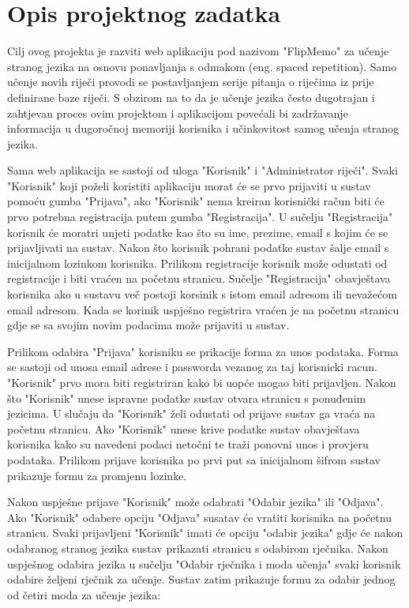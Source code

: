 \chapter{Opis projektnog zadatka}

Cilj ovog projekta je razviti web aplikaciju pod nazivom "FlipMemo" za učenje stranog jezika na osnovu ponavljanja s odmakom (eng. spaced repetition). Samo učenje novih riječi provodi se postavljanjem serije pitanja o riječima iz prije definirane baze riječi. S obzirom na to da je učenje jezika često dugotrajan i zahtjevan proces ovim projektom i aplikacijom povećali bi zadržavanje informacija u dugoročnoj memoriji korisnika i učinkovitost samog učenja stranog jezika.

Sama web aplikacija se sastoji od uloga "Korisnik" i "Administrator riječi". Svaki "Korisnik" koji poželi koristiti aplikaciju morat će se prvo prijaviti u sustav pomoću  gumba "Prijava", ako "Korisnik" nema kreiran korisnički račun biti će prvo potrebna registracija putem gumba "Registracija". U sučelju "Registracija" korisnik će moratri unjeti podatke kao što su ime, prezime, email s kojim će se prijavljivati na sustav. Nakon što korisnik pohrani podatke sustav šalje email s inicijalnom lozinkom korisnika. Prilikom registracije korisnik može odustati od registracije i biti vraćen na početnu stranicu. Sučelje "Registracija" obavještava korisnika ako u sustavu več postoji korsinik s istom email adresom ili nevažećom email adresom. Kada se korinik uspješno registrira vraćen je na početnu stranicu gdje se sa svojim novim podacima može prijaviti u sustav.

Prilikom odabira "Prijava" korisniku se prikacije forma za unos podataka. Forma se sastoji od unosa email adrese i passworda vezanog za taj korisnicki racun. "Korisnik" prvo mora biti registriran kako bi uopće mogao biti prijavljen. Nakon što "Korisnik" unese ispravne podatke  sustav otvara stranicu s ponuđenim jezicima. U slučaju da "Korisnik" želi odustati od prijave sustav ga vraća na početnu stranicu. Ako "Korisnik" unese krive podatke sustav obavještava korisnika kako su navedeni podaci netočni te traži ponovni unos i provjeru podataka. Prilikom prijave korisnika po prvi put sa inicijalnom šifrom sustav prikazuje formu za promjenu lozinke.

Nakon uspješne prijave "Korisnik" može odabrati "Odabir jezika" ili "Odjava".
Ako "Korisnik" odabere opciju "Odjava" susatav će vratiti korisnika na početnu stranicu. Svaki prijavljeni "Korisnik" imati će opciju "odabir jezika" gdje će nakon odabranog stranog jezika sustav prikazati stranicu s odabirom rječnika.
Nakon uspješnog odabira jezika u sučelju "Odabir rječnika i moda učenja" svaki korisnik odabire željeni rječnik za učenje. Sustav zatim prikazuje formu za odabir jednog od četiri moda za učenje jezika: 


